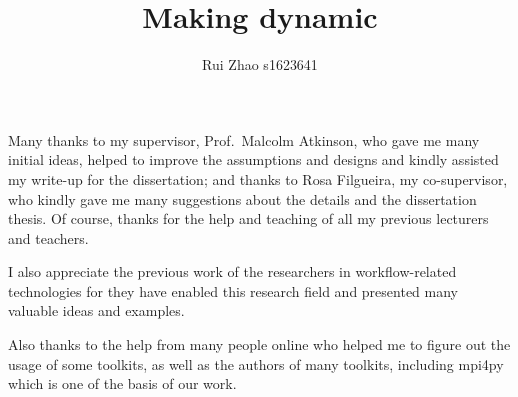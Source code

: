 \documentclass[msc,cs,deptreport,logo,abbrevs,11pt]{infthesis}
\title{Making \dpy dynamic}
\author{Rui Zhao s1623641}
\begin{document}
\begin{preliminary}
\maketitle

\begin{acknowledgements}
Many thanks to my supervisor, Prof.\ Malcolm Atkinson, who gave me many initial ideas, helped to improve the assumptions and designs and kindly assisted my write-up for the dissertation; and thanks to Rosa Filgueira, my co-supervisor, who kindly gave me many suggestions about the details and the dissertation thesis. Of course, thanks for the help and teaching of all my previous lecturers and teachers.

I also appreciate the previous work of the researchers in workflow-related technologies for they have enabled this research field and presented many valuable ideas and examples.

Also thanks to the help from many people online who helped me to figure out the usage of some toolkits, as well as the authors of many toolkits, including mpi4py which is one of the basis of our work.
\end{acknowledgements}

\standarddeclaration


\tableofcontents


\end{preliminary}



	





	

	

	




%

%





\end{document}
